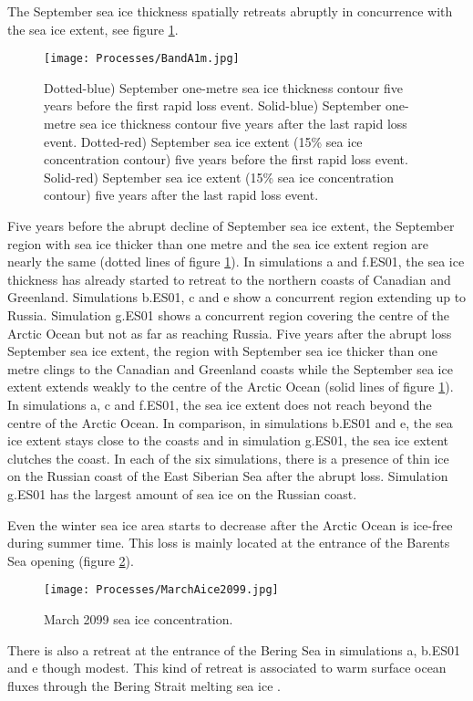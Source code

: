 The September sea ice thickness spatially retreats abruptly in concurrence with the sea ice extent, see figure \ref{1m}. 
\begin{figure}[t!]
\center
\noindent\texttt{[image: Processes/BandA1m.jpg]}
\caption{Dotted-blue) September one-metre sea ice thickness contour five years before the first rapid loss event. Solid-blue) September one-metre sea ice thickness contour five years after the last rapid loss event. Dotted-red) September sea ice extent (15\% sea ice concentration contour) five years before the first rapid loss event. Solid-red) September sea ice extent (15\% sea ice concentration contour) five years after the last rapid loss event.}
\label{1m}
\end{figure}
Five years before the abrupt decline of September sea ice extent, the September region with sea ice thicker than one metre and the sea ice extent region are nearly the same (dotted lines of figure \ref{1m}). In simulations a and f.ES01, the sea ice thickness has already started to retreat to the northern coasts of Canadian and Greenland. Simulations b.ES01, c and e show a concurrent region extending up to Russia. Simulation g.ES01 shows a concurrent region covering the centre of the Arctic Ocean but not as far as reaching Russia. Five years after the abrupt loss September sea ice extent, the region with September sea ice thicker than one metre clings to the Canadian and Greenland coasts while the September sea ice extent extends weakly to the centre of the Arctic Ocean (solid lines of figure \ref{1m}). In simulations a, c and f.ES01, the sea ice extent does not reach beyond the centre of the Arctic Ocean. In comparison, in simulations b.ES01 and e, the sea ice extent stays close to the coasts and in simulation g.ES01, the sea ice extent clutches the coast. In each of the six simulations, there is a presence of thin ice on the Russian coast of the East Siberian Sea after the abrupt loss. Simulation g.ES01 has the largest amount of sea ice on the Russian coast. 

Even the winter sea ice area starts to decrease after the Arctic Ocean is ice-free during summer time. This loss is mainly located at the entrance of the Barents Sea opening (figure \ref{march2099}). 
\begin{figure}[t]
\center
\noindent\texttt{[image: Processes/MarchAice2099.jpg]}
\caption{March 2099 sea ice concentration.}
\label{march2099}
\end{figure}
There is also a retreat at the entrance of the Bering Sea in simulations a, b.ES01 and e though modest. This kind of retreat is associated to warm surface ocean fluxes through the Bering Strait melting sea ice \citep{Woodgate2010}.

